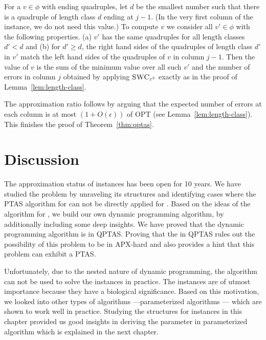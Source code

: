 For a $v \in \phi$ with ending quadruples,
let $d$ be the smallest number such that there is a quadruple of length class $d$ ending at $j-1$. (In the very first column of the instance, we do not need this value.)
To compute $v$ we consider all $v' \in \phi$ with the following properties.
(a) $v'$ has the same quadruples for all length classes $d' < d$ and 
(b) for $d' \ge d$, the right hand sides of the quadruples of length class $d'$ in $v'$ match the left hand sides of the quadruples of $v$ in column $j-1$.
Then the value of $v$ is the sum of the minimum value over all such $v'$ and the number of errors in column $j$ obtained by applying $\textsc{SWC}_{\varepsilon^3}$ exactly as in the proof of Lemma~\ref{lem:length-class}. 
%

The approximation ratio follows 
by
arguing that the expected number of errors at each column is at most $(1+O(\epsilon))$ of OPT
(see Lemma~\ref{lem:length-class}).
This finishes the proof of Theorem~\ref{thm:qptas}.
\section{Discussion}
The approximation status of \GMEC instances has been open for 10 years. 
We have studied the problem by unraveling its structures and identifying cases where the PTAS algorithm for \BMEC can not be directly applied for \GMEC.
Based on the ideas of the algorithm for \BMEC, we build our own dynamic programming algorithm, by additionally including some deep insights. 
We have proved that the dynamic programming algorithm is in QPTAS.
Proving that the \GMEC in QPTAS rules out the possibility of this problem to be in APX-hard and also provides a hint that this problem can exhibit a PTAS.

Unfortunately, due to the nested nature of dynamic programming, the algorithm can not be used to solve the \GMEC instances in practice.
The \GMEC instances are of utmost importance because they have a biological significance.
Based on this motivation, we looked into other types of algorithms ---parameterized algorithms \citep{martin2016whatshap} --- which are shown to work well in practice.
Studying the structures for \GMEC instances in this chapter provided us good insights in deriving the parameter in parameterized algorithm which is explained in the next chapter.
